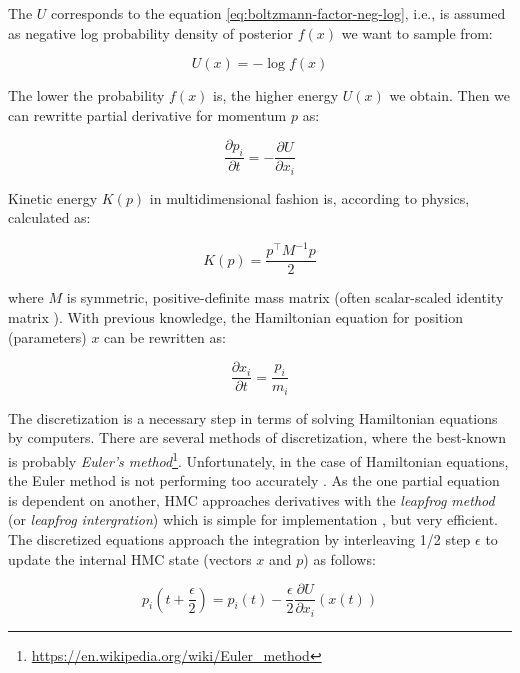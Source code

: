 \documentclass[
  digital, %
  oneside, %
  lof,     %
  lot,     %
]{fithesis4}
\begin{document}
The $U$ corresponds to the equation \ref{eq:boltzmann-factor-neg-log}, i.e., is assumed as negative log probability density of posterior $f(x)$ we want to sample from:

\begin{equation}
  U(x) = -\log f(x)
\end{equation}

The lower the probability $f(x)$ is, the higher energy $U(x)$ we obtain. 
Then we can rewritte partial derivative for momentum $p$ as:

\begin{equation}
  \frac{\partial p_i}{\partial t} = - \frac{\partial U}{\partial x_i}
\end{equation}

Kinetic energy $K(p)$ in multidimensional fashion is, according to physics, calculated as:

\begin{equation}
  K(p) = \frac{p^{\top} M^{-1} p}{2}
\end{equation}

where $M$ is symmetric, positive-definite mass matrix (often scalar-scaled identity matrix \cite{neal2011}).
With previous knowledge, the Hamiltonian equation for position (parameters) $x$ can be rewritten as:

\begin{equation}
  \frac{\partial x_i}{\partial t} = \frac{p_i}{m_i}
\end{equation}

The discretization is a necessary step in terms of solving Hamiltonian equations by computers.
There are several methods of discretization, where the best-known is probably \textit{Euler's method}\footnote{\url{https://en.wikipedia.org/wiki/Euler_method}}.
Unfortunately, in the case of Hamiltonian equations, the Euler method is not performing too accurately \cite[Chapter 5]{neal2011}.
As the one partial equation is dependent on another, HMC approaches derivatives with the \textit{leapfrog method} (or \textit{leapfrog intergration}) which is simple for implementation \cite{betancourt2018}, but very efficient.
The discretized equations approach the integration by interleaving 1/2 step $\epsilon$ to update the internal HMC state (vectors $x$ and $p$) as follows:

\begin{equation}
  p_i \left(t + \frac{\epsilon}{2} \right) = p_i(t) - \frac{\epsilon}{2} \frac{\partial U}{\partial x_i} (x(t))
\end{equation}
\end{document}
